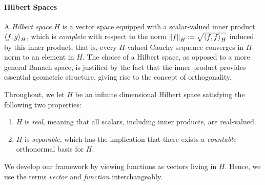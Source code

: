 \paragraph{Hilbert Spaces}
A \textit{Hilbert space} \(H\) is a vector space equipped with a scalar-valued inner product \(\ev{f, g}_{H}\), which is \textit{complete} with respect to the norm \(\norm{f}_{H} \coloneqq \sqrt{\ev{f, f}_{H}}\) induced by this inner product, that is, every \(H\)-valued Cauchy sequence converges in \(H\)-norm to an element in \(H\). The choice of a Hilbert space, as opposed to a more general Banach space, is justified by the fact that the inner product provides essential geometric structure, giving rise to the concept of orthogonality.

Throughout, we let \(H\) be an infinite dimensional Hilbert space satisfying the following two properties:
\begin{enumerate}
  \item \(H\) is \textit{real}, meaning that all scalars, including inner products, are real-valued.
  \item \(H\) is \textit{separable}, which has the implication that there exists a \textit{countable} orthonormal basis for \(H\).
\end{enumerate}

We develop our framework by viewing functions as vectors living in \(H\). Hence, we use the terms \textit{vector} and \textit{function} interchangeably.

